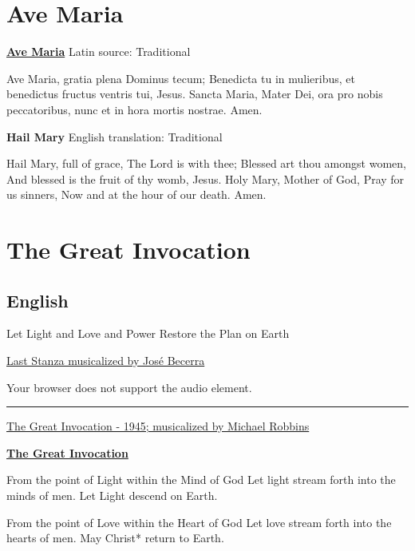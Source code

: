 \documentclass[
]{book}
\begin{document}
\hypertarget{ave-maria}{%
\chapter{Ave Maria}\label{ave-maria}}

\textbf{\href{https://www.youtube.com/watch?v=k-8KNIe3VeE}{Ave Maria}}
Latin source: Traditional

Ave Maria, gratia plena
Dominus tecum;
Benedicta tu in mulieribus,
et benedictus fructus ventris tui, Jesus.
Sancta Maria, Mater Dei,
ora pro nobis peccatoribus,
nunc et in hora mortis nostrae.
Amen.

\textbf{Hail Mary}
English translation: Traditional

Hail Mary, full of grace,
The Lord is with thee;
Blessed art thou amongst women,
And blessed is the fruit of thy womb, Jesus.
Holy Mary, Mother of God,
Pray for us sinners,
Now and at the hour of our death.
Amen.

\hypertarget{the-great-invocation}{%
\chapter{The Great Invocation}\label{the-great-invocation}}

\hypertarget{english}{%
\section{English}\label{english}}

Let Light and Love and Power
Restore the Plan on Earth

\href{https://ngsm.org/mp3/The\%20Great\%20Invocation.mp3}{Last Stanza musicalized by José Becerra}

Your browser does not support the audio element.

\begin{center}\rule{0.5\linewidth}{0.5pt}\end{center}

\href{https://www.youtube.com/watch?v=gg2Sa8SRePg}{The Great Invocation - 1945; musicalized by Michael Robbins}

\textbf{\href{https://www.lucistrust.org/mantrams//the_great_invocation2}{The Great Invocation}}

From the point of Light within the Mind of God
Let light stream forth into the minds of men.
Let Light descend on Earth.

From the point of Love within the Heart of God
Let love stream forth into the hearts of men.
May Christ* return to Earth.
\end{document}
